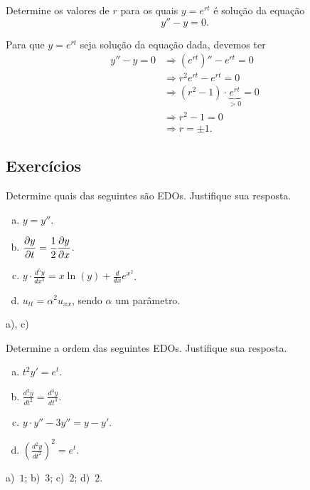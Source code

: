 \begin{exeresol}
  Determine os valores de $r$ para os quais $y = e^{rt}$ é solução da equação
  \begin{equation}
    y'' - y = 0.
  \end{equation}
\end{exeresol}
\begin{exeresol}
  Para que $y = e^{rt}$ seja solução da equação dada, devemos ter
  \begin{align}
    y'' - y = 0 &\Rightarrow \left(e^{rt}\right)'' - e^{rt} = 0 \\
                &\Rightarrow r^2e^{rt} - e^{rt} = 0 \\
                &\Rightarrow (r^2 - 1)\cdot \underbrace{e^{rt}}_{>0} = 0\\
                &\Rightarrow r^2 - 1 = 0 \\
                &\Rightarrow r = \pm 1.
  \end{align}
\end{exeresol}

\subsection*{Exercícios}

\begin{exer}
  Determine quais das seguintes são EDOs. Justifique sua resposta.
  \begin{enumerate}[a)]
  \item $\displaystyle y = y''$.
  \item $\displaystyle \frac{\partial y}{\partial t} = \frac{1}{2}\frac{\partial y}{\partial x}$.
  \item $\displaystyle y\cdot \frac{d^5y}{dx^5} = x\ln(y) + \frac{d}{dx}e^{x^2}$.
  \item $u_{tt} = \alpha^2u_{xx}$, sendo $\alpha$ um parâmetro.
  \end{enumerate}
\end{exer}
\begin{resp}
  a), c)
\end{resp}

\begin{exer}\label{exer:edo_ordem}
  Determine a ordem das seguintes EDOs. Justifique sua resposta.
  \begin{enumerate}[a)]
  \item $\displaystyle t^2y' = e^{t}$.
  \item $\displaystyle \frac{d^2y}{dt^2} = \frac{d^3y}{dt^3}$.
  \item $\displaystyle y\cdot y'' - 3y'' = y - y'$.
  \item $\displaystyle \left(\frac{d^2y}{dt^2}\right)^2 = e^t$.
  \end{enumerate}
\end{exer}
\begin{resp}
  a)~$1$; b)~$3$; c)~$2$; d)~$2$.
\end{resp}

